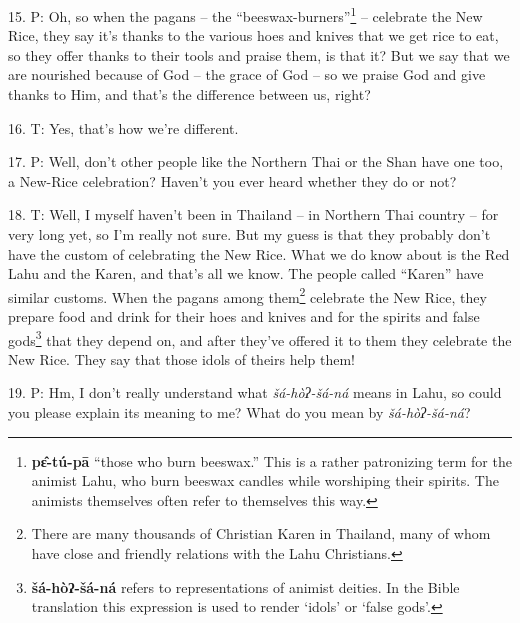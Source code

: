 15. P: Oh, so when the pagans -- the ``beeswax-burners''\footnote{\textbf{pɛ̂-tú-pā} ``those who burn beeswax.'' This is a rather patronizing term for the animist Lahu, who burn beeswax candles while worshiping their spirits. The animists themselves often refer to themselves this way.} --
celebrate the New Rice, they say it's thanks to the various hoes and knives that
we get rice to eat, so they offer thanks to their tools and praise them, is that
it? But we say that we are nourished because of God -- the grace of God -- so we
praise God and give thanks to Him, and that's the difference between us, right?

16. T: Yes, that's how we're different.

17. P: Well, don't other people like the Northern Thai or the Shan have one too,
a New-Rice celebration? Haven't you ever heard whether they do or not?

18. T: Well, I myself haven't been in Thailand -- in Northern Thai country -- for
very long yet, so I'm really not sure. But my guess is that they probably don't
have the custom of celebrating the New Rice. What we do know about is the Red Lahu
and the Karen, and that's all we know. The people called ``Karen''
have similar customs. When the pagans among them\footnote{There are many thousands of Christian Karen in Thailand, many of whom have close and friendly relations with the Lahu Christians.} celebrate the New Rice, they
prepare food and drink for their hoes and knives and for the spirits and false
gods\footnote{\textbf{šá-hòʔ-šá-ná} refers to representations of animist deities. In the Bible translation this expression is used to render `idols' or `false gods'.} that they depend on, and after they've offered it to them they celebrate
the New Rice. They say that those idols of theirs help them!

19. P: Hm, I don't really understand what \textit{šá-hòʔ-šá-ná} means in
Lahu, so could you please explain its meaning to me? What do you mean by \textit{šá-hòʔ-šá-ná}?

